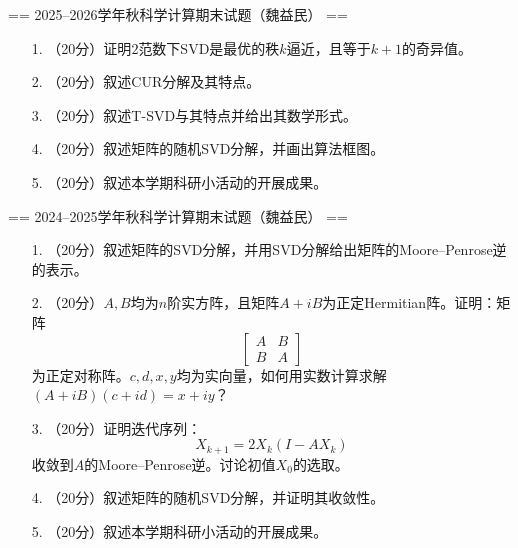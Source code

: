 
== 2025--2026学年秋科学计算期末试题（魏益民） ==

\begin{itemize}
    \item[1.]（20分）证明$2$范数下SVD是最优的秩$k$逼近，且等于$k+1$的奇异值。

    \item[2.]（20分）叙述CUR分解及其特点。

    \item[3.]（20分）叙述T-SVD与其特点并给出其数学形式。

    \item[4.]（20分）叙述矩阵的随机SVD分解，并画出算法框图。

    \item[5.]（20分）叙述本学期科研小活动的开展成果。
\end{itemize}

== 2024--2025学年秋科学计算期末试题（魏益民） ==

\begin{itemize}
    \item[1.]（20分）叙述矩阵的SVD分解，并用SVD分解给出矩阵的Moore–Penrose逆的表示。

    \item[2.]（20分）$A,B$均为$n$阶实方阵，且矩阵$A+iB$为正定Hermitian阵。证明：矩阵\[
    \begin{bmatrix}
        A & B \\
        B & A
    \end{bmatrix}
    \]为正定对称阵。$c,d,x,y$均为实向量，如何用实数计算求解$(A+iB)(c+id)=x+iy$？

    \item[3.]（20分）证明迭代序列：\[
        X_{k+1}=2X_k(I-AX_k)
    \]收敛到$A$的Moore–Penrose逆。讨论初值$X_0$的选取。

    \item[4.]（20分）叙述矩阵的随机SVD分解，并证明其收敛性。


    \item[5.]（20分）叙述本学期科研小活动的开展成果。
\end{itemize}